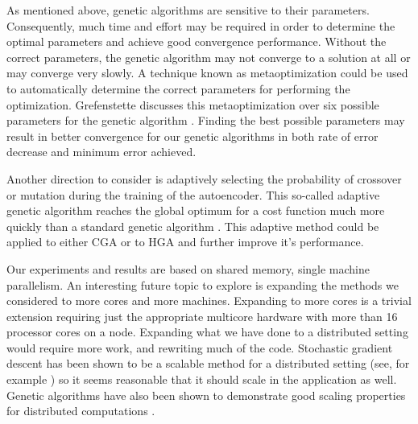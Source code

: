 As mentioned above, genetic algorithms are sensitive to their parameters. Consequently, much time and effort may be required in order to determine the optimal parameters and achieve good convergence performance. Without the correct parameters, the genetic algorithm may not converge to a solution at all or may converge very slowly. A technique known as metaoptimization could be used to automatically determine the correct parameters for performing the optimization. Grefenstette discusses this metaoptimization over six possible parameters for the genetic algorithm \cite{metaoptimization}. Finding the best possible parameters may result in better convergence for our genetic algorithms in both rate of error decrease and minimum error achieved.

Another direction to consider is adaptively selecting the probability of crossover or mutation during the training of the autoencoder. This so-called adaptive genetic algorithm reaches the global optimum for a cost function much more quickly than a standard genetic algorithm \cite{srinivas94adaptive}. This adaptive method could be applied to either CGA or to HGA and further improve it's performance.

Our experiments and results are based on shared memory, single machine parallelism. An interesting future topic to explore is expanding the methods we considered to more cores and more machines. Expanding to more cores is a trivial extension requiring just the appropriate multicore hardware with more than 16 processor cores on a node. Expanding what we have done to a distributed setting would require more work, and rewriting much of the code. Stochastic gradient descent has been shown to be a scalable method for a distributed setting (see, for example \cite{zinkevich2010psgd}) so it seems reasonable that it should scale in the application as well. Genetic algorithms have also been shown to demonstrate good scaling properties for distributed computations \cite{Belding95thedistributed}.
